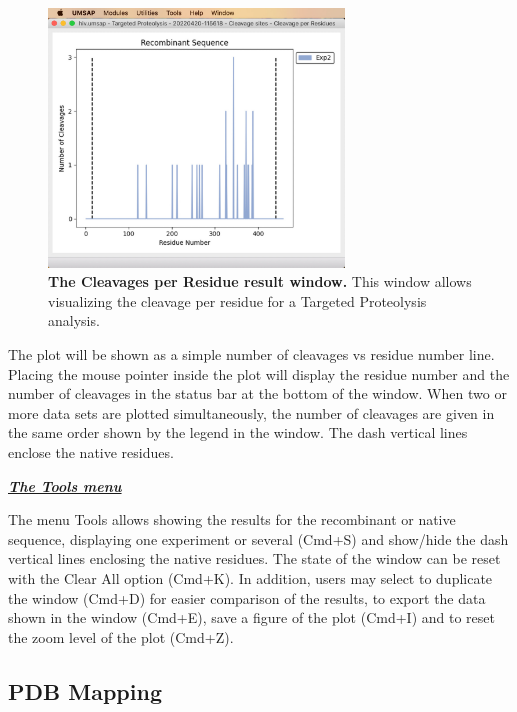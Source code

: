 \begin{figure}[h]
    \centering
    \includegraphics[width=0.7\textwidth]{./IMAGES/MOD-TARPROT/tarprot-cutres.jpg}
    \caption[The Cleavages per Residue result window]{\textbf{The Cleavages per
    Residue result window.} This window allows visualizing the cleavage per residue
    for a Targeted Proteolysis analysis.}
    \label{fig:tarprotCutsRes}
    \vspace{-5pt}
\end{figure}

The plot will be shown as a simple number of cleavages vs residue number line.
Placing the mouse pointer inside the plot will display the residue number and the
number of cleavages in the status bar at the bottom of the window. When two or more
data sets are plotted simultaneously, the number of cleavages are given in the same
order shown by the legend in the window. The dash vertical lines enclose the native
residues. 

\textit{\textbf{\underline{The Tools menu}}}

The menu Tools allows showing the results for the recombinant or native sequence,
displaying one experiment or several (Cmd+S) and show/hide the dash vertical lines
enclosing the native residues. The state of the window can be reset with the Clear All
option (Cmd+K). In addition, users may select to duplicate the window (Cmd+D) for
easier comparison of the results, to export the data shown in the window (Cmd+E),
save a figure of the plot (Cmd+I) and to reset the zoom level of the plot (Cmd+Z).

\subsection{PDB Mapping}
\label{subsec:tarprotPDB}

